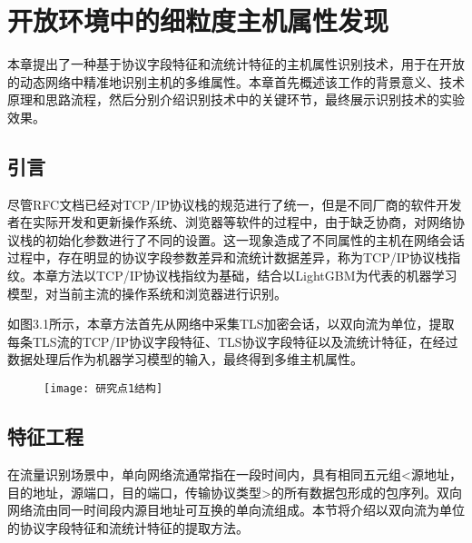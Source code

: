 \chapter{开放环境中的细粒度主机属性发现}\label{chap:First_Point}
本章提出了一种基于协议字段特征和流统计特征的主机属性识别技术，用于在开放的动态网络中精准地识别主机的多维属性。本章首先概述该工作的背景意义、技术原理和思路流程，然后分别介绍识别技术中的关键环节，最终展示识别技术的实验效果。

\section{引言}

尽管RFC文档已经对TCP/IP协议栈的规范进行了统一，但是不同厂商的软件开发者在实际开发和更新操作系统、浏览器等软件的过程中，由于缺乏协商，对网络协议栈的初始化参数进行了不同的设置。这一现象造成了不同属性的主机在网络会话过程中，存在明显的协议字段参数差异和流统计数据差异，称为TCP/IP协议栈指纹。本章方法以TCP/IP协议栈指纹为基础，结合以LightGBM为代表的机器学习模型，对当前主流的操作系统和浏览器进行识别。

如图3.1所示，本章方法首先从网络中采集TLS加密会话，以双向流为单位，提取每条TLS流的TCP/IP协议字段特征、TLS协议字段特征以及流统计特征，在经过数据处理后作为机器学习模型的输入，最终得到多维主机属性。

\begin{figure}[!htbp]
    \centering
    \texttt{[image: 研究点1结构]}
\end{figure}

\section{特征工程}

在流量识别场景中，单向网络流通常指在一段时间内，具有相同五元组<源地址，目的地址，源端口，目的端口，传输协议类型>的所有数据包形成的包序列。双向网络流由同一时间段内源目地址可互换的单向流组成。本节将介绍以双向流为单位的协议字段特征和流统计特征的提取方法。

